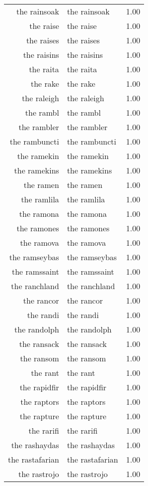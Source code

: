 \begin{table}[ht]
\begin{tabular}{rlr}
  the rainsoak & the rainsoak & 1.00 \\ 
  the raise & the raise & 1.00 \\ 
  the raises & the raises & 1.00 \\ 
  the raisins & the raisins & 1.00 \\ 
  the raita & the raita & 1.00 \\ 
  the rake & the rake & 1.00 \\ 
  the raleigh & the raleigh & 1.00 \\ 
  the rambl & the rambl & 1.00 \\ 
  the rambler & the rambler & 1.00 \\ 
  the rambuncti & the rambuncti & 1.00 \\ 
  the ramekin & the ramekin & 1.00 \\ 
  the ramekins & the ramekins & 1.00 \\ 
  the ramen & the ramen & 1.00 \\ 
  the ramlila & the ramlila & 1.00 \\ 
  the ramona & the ramona & 1.00 \\ 
  the ramones & the ramones & 1.00 \\ 
  the ramova & the ramova & 1.00 \\ 
  the ramseybas & the ramseybas & 1.00 \\ 
  the ramssaint & the ramssaint & 1.00 \\ 
  the ranchland & the ranchland & 1.00 \\ 
  the rancor & the rancor & 1.00 \\ 
  the randi & the randi & 1.00 \\ 
  the randolph & the randolph & 1.00 \\ 
  the ransack & the ransack & 1.00 \\ 
  the ransom & the ransom & 1.00 \\ 
  the rant & the rant & 1.00 \\ 
  the rapidfir & the rapidfir & 1.00 \\ 
  the raptors & the raptors & 1.00 \\ 
  the rapture & the rapture & 1.00 \\ 
  the rarifi & the rarifi & 1.00 \\ 
  the rashaydas & the rashaydas & 1.00 \\ 
  the rastafarian & the rastafarian & 1.00 \\ 
  the rastrojo & the rastrojo & 1.00 \\ 

\end{tabular}
\end{table}
